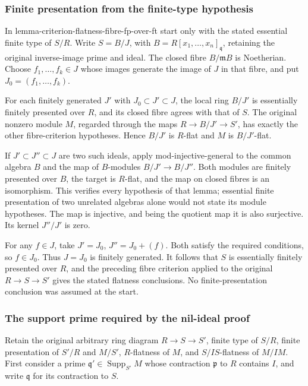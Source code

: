 \subsubsection{Finite presentation from the finite-type hypothesis}\label{algebra-proof-038-finite-presentation-from-the-finite-type-hypothesis}

In lemma-criterion-flatness-fibre-fp-over-ft start only with the stated essential finite type of \(S/R\). Write \(S=B/J\), with \(B=R[x_1,\ldots,x_n]_{\mathfrak q}\), retaining the original inverse-image prime and ideal. The closed fibre \(B/\mathfrak mB\) is Noetherian. Choose \(f_1,\ldots,f_k\in J\) whose images generate the image of \(J\) in that fibre, and put \(J_0=(f_1,\ldots,f_k)\).

For each finitely generated \(J'\) with \(J_0\subset J'\subset J\), the local ring \(B/J'\) is essentially finitely presented over \(R\), and its closed fibre agrees with that of \(S\). The original nonzero module \(M\), regarded through the maps \(R\to B/J'\to S'\), has exactly the other fibre-criterion hypotheses. Hence \(B/J'\) is \(R\)-flat and \(M\) is \(B/J'\)-flat.

If \(J'\subset J''\subset J\) are two such ideals, apply mod-injective-general to the common algebra \(B\) and the map of \(B\)-modules \(B/J'\to B/J''\). Both modules are finitely presented over \(B\), the target is \(R\)-flat, and the map on closed fibres is an isomorphism. This verifies every hypothesis of that lemma; essential finite presentation of two unrelated algebras alone would not state its module hypotheses. The map is injective, and being the quotient map it is also surjective. Its kernel \(J''/J'\) is zero.

For any \(f\in J\), take \(J'=J_0\), \(J''=J_0+(f)\). Both satisfy the required conditions, so \(f\in J_0\). Thus \(J=J_0\) is finitely generated. It follows that \(S\) is essentially finitely presented over \(R\), and the preceding fibre criterion applied to the original \(R\to S\to S'\) gives the stated flatness conclusions. No finite-presentation conclusion was assumed at the start.

\subsubsection{The support prime required by the nil-ideal proof}\label{algebra-proof-038-the-support-prime-required-by-the-nil-ideal-proof}

Retain the original arbitrary ring diagram \(R\to S\to S'\), finite type of \(S/R\), finite presentation of \(S'/R\) and \(M/S'\), \(R\)-flatness of \(M\), and \(S/IS\)-flatness of \(M/IM\). First consider a prime \(\mathfrak q'\in\operatorname{Supp}_{S'}M\) whose contraction \(\mathfrak p\) to \(R\) contains \(I\), and write \(\mathfrak q\) for its contraction to \(S\).

